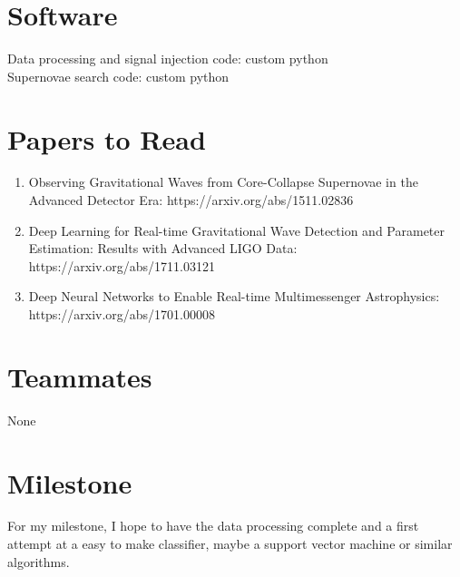 \documentclass{article}
\begin{document}
\section*{\large Software}
Data processing and signal injection code: custom python\\
Supernovae search code: custom python

\section*{\large Papers to Read}
\begin{enumerate}
\item{Observing Gravitational Waves from Core-Collapse Supernovae in the Advanced Detector Era: https://arxiv.org/abs/1511.02836}
\item{Deep Learning for Real-time Gravitational Wave Detection and Parameter Estimation: Results with Advanced LIGO Data: https://arxiv.org/abs/1711.03121}
\item{Deep Neural Networks to Enable Real-time Multimessenger Astrophysics: https://arxiv.org/abs/1701.00008}
\end{enumerate}
\section*{\large Teammates}
None
\section*{\large Milestone}
For my milestone, I hope to have the data processing complete and a first attempt at a easy to make classifier, maybe a support vector machine or similar algorithms.
\end{document}
